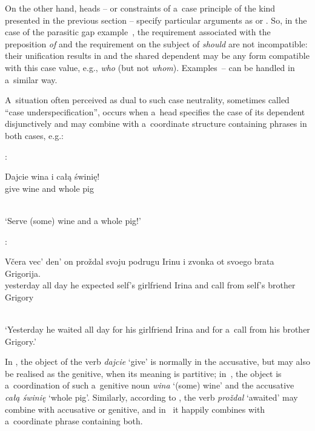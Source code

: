 \documentclass[output=paper]{langsci/langscibook}
\begin{document}
On the other hand, heads – or constraints of a~case principle of the kind presented in the previous section – specify particular arguments as  or .  So, in the case of the parasitic gap example~, the  requirement associated with the preposition \emph{of} and the  requirement on the subject of \emph{should} are not incompatible: their unification results in  and the shared dependent may be any form compatible with this case value, e.g., \emph{who} (but not \emph{whom}).  Examples~– can be handled in a~similar way.

A~situation often perceived as dual to such case neutrality, sometimes called “case underspecification”, occurs when a~head specifies the case of its dependent disjunctively and may combine with a~coordinate structure containing phrases in both cases, e.g.:
\begin{examples}
\item\label{ex:dis:pl}  \citep[175]{Prze99b}: \\ [1ex]
  \begin{gloss}
    Dajcie wina i całą świnię! \\
    give wine\Gen{} and whole\Acc{} pig\Acc{}
  \end{gloss}\\[\glosslen]
  ‘Serve (some) wine and a whole pig!’
\item\label{ex:dis:ru}  \citep[11]{levy:01}: \\ [1ex]
  \begin{gloss}
    V{\v c}era vec' den' on pro{\v z}dal svoju podrugu Irinu i zvonka ot svoego brata Grigorija. \\
    yesterday all day he expected self's\Acc{} girlfriend\Acc{} Irina\Acc{} and call\Gen{} from self's brother Grigory
  \end{gloss}\\[\glosslen]
  ‘Yesterday he waited all day for his girlfriend Irina and for a~call from his brother Grigory.’
\end{examples}
In , the object of the verb \emph{dajcie} ‘give’ is normally in the accusative, but may also be realised as the genitive, when its meaning is partitive; in~, the object is a~coordination of such a~genitive noun \emph{wina} ‘(some) wine’ and the accusative \emph{całą świnię} ‘whole pig’.  Similarly, according to \citealt{levy:01}, the  verb \emph{pro{\v z}dal} ‘awaited’ may combine with accusative or genitive, and in~ it happily combines with a~coordinate phrase containing both.
\end{document}
